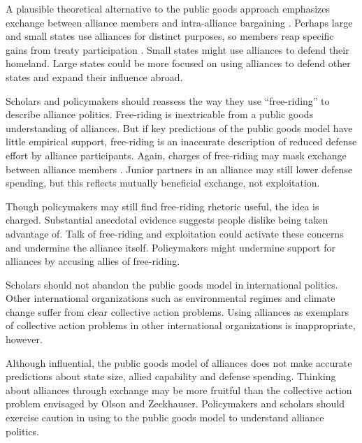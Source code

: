 \documentclass[12pt]{article}
\begin{document}
A plausible theoretical alternative to the public goods approach emphasizes exchange between alliance members and intra-alliance bargaining \citep{Norrlof2010, Brooksetal2013, Kim2016}. 
Perhaps large and small states use alliances for distinct purposes, so members reap specific gains from treaty participation \citep{Morrow1991, Johnson2015}. 
Small states might use alliances to defend their homeland. 
Large states could be more focused on using alliances to defend other states and expand their influence abroad. 


Scholars and policymakers should reassess the way they use ``free-riding'' to describe alliance politics. 
Free-riding is inextricable from a public goods understanding of alliances.
But if key predictions of the public goods model have little empirical support, free-riding is an inaccurate description of reduced defense effort by alliance participants.  
Again, charges of free-riding may mask exchange between alliance members \citep{Lanoszka2015}. 
Junior partners in an alliance may still lower defense spending, but this reflects mutually beneficial exchange, not exploitation. 


Though policymakers may still find free-riding rhetoric useful, the idea is charged. 
Substantial anecdotal evidence suggests people dislike being taken advantage of. 
Talk of free-riding and exploitation could activate these concerns and undermine the alliance itself.
Policymakers might undermine support for alliances by accusing allies of free-riding. 


Scholars should not abandon the public goods model in international politics. 
Other international organizations such as environmental regimes and climate change suffer from clear collective action problems.  
Using alliances as exemplars of collective action problems in other international organizations is inappropriate, however. 


Although influential, the public goods model of alliances does not make accurate predictions about state size, allied capability and defense spending. 
Thinking about alliances through exchange may be more fruitful than the collective action problem envisaged by Olson and Zeckhauser.
Policymakers and scholars should exercise caution in using to the public goods model to understand alliance politics.  



\singlespace


 
\end{document}
